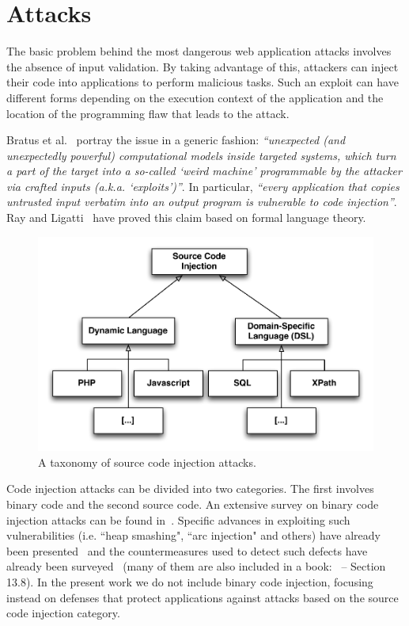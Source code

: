 \documentclass[conference]{IEEEtran}
\begin{document}
\section{Attacks}
\label{sec:attacks}

The basic problem behind the most dangerous
web application attacks involves
the absence of input validation. By taking advantage of
this, attackers can inject their code into
applications to perform malicious tasks. Such
an exploit can have different forms depending on the
execution context of the application and the location
of the programming flaw that leads to the attack.

Bratus et al.~\cite{BLSPS11} portray the issue in a generic fashion:
{\it ``unexpected (and unexpectedly powerful) computational models
  inside targeted systems, which turn a part of the target into a
  so-called `weird machine' programmable by the attacker via crafted
  inputs (a.k.a. `exploits')''}. In particular, {\it ``every
  application that copies untrusted input verbatim into an output
  program is vulnerable to code injection''}. Ray and
Ligatti~\cite{RL12b} have proved this claim based on formal language
theory.

\begin{figure}
\begin{center}
\leavevmode
\includegraphics[scale=0.47]{attack-tree-uml.pdf}
\end{center}
\caption{\label{fig:taxonomy}A taxonomy of source
code injection attacks.}
\end{figure}

Code injection attacks can be divided into two categories. The first
involves binary code and the second source code. An
extensive survey on binary code injection attacks can be found
in~\cite{LC03}. Specific advances in exploiting such vulnerabilities
(i.e. ``heap smashing", ``arc injection" and others) have already
been presented~\cite{PB04} and the countermeasures used to detect such
defects have already been surveyed~\cite{YJP12} (many of them are also
included in a book:~\cite{DKZ12} -- Section 13.8). In the present work
we do not include binary code injection, focusing instead on defenses
that protect applications against attacks based on the
source code injection category.
\end{document}
